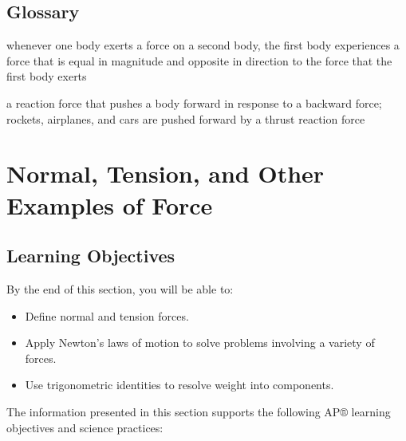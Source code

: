 \documentclass[
]{book}
\providecommand{\tightlist}{%
  \setlength{\itemsep}{0pt}\setlength{\parskip}{0pt}}
\begin{document}
\hypertarget{glossary-14}{%
\subsection{Glossary}\label{glossary-14}}

\begin{description}
\tightlist
\item[Newton's third law of motion]
whenever one body exerts a force on a second body, the first body
experiences a force that is equal in magnitude and opposite in
direction to the force that the first body exerts
\end{description}

\begin{description}
\tightlist
\item[thrust]
a reaction force that pushes a body forward in response to a
backward force; rockets, airplanes, and cars are pushed forward by a
thrust reaction force
\end{description}

\hypertarget{normal-tension-and-other-examples-of-force}{%
\section{Normal, Tension, and Other Examples of Force}\label{normal-tension-and-other-examples-of-force}}

\hypertarget{fs-id1904445}{}
\hypertarget{learning-objectives-16}{%
\subsection{Learning Objectives}\label{learning-objectives-16}}

By the end of this section, you will be able to:

\begin{itemize}
\tightlist
\item
  Define normal and tension forces.
\item
  Apply Newton's laws of motion to solve problems involving a variety
  of forces.
\item
  Use trigonometric identities to resolve weight into components.
\end{itemize}

The information presented in this section supports the following AP®
learning objectives and science practices:
\end{document}
